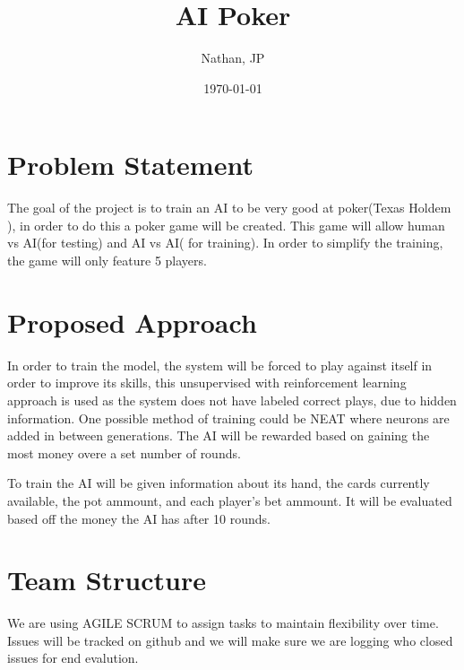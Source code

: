 \documentclass[11pt]{article}
\title{AI Poker}
\author{Nathan, JP}
\date{\today}
\begin{document}
\maketitle
\section{Problem Statement}
The goal of the project is to train an AI to be very good at poker(Texas Holdem \cite{TexasHoldEm}),
in order to do this a poker game will be created. This game will allow human vs AI(for testing) and AI vs AI(
for training). In order to simplify the training, the game will only feature 5 players.

\section{Proposed Approach}
In order to train the model, the system will be forced to play against itself in order to improve its skills,
this unsupervised with reinforcement learning approach is used as the system does not have labeled correct
plays, due to hidden information. One possible method of training could be NEAT\cite{NEAT} where neurons are
added in between generations. The AI will be rewarded based on gaining the most money overe a set number of rounds.

To train the AI will be given information about its hand, the cards currently available, the pot ammount, and
each player's bet ammount. It will be evaluated based off the money the AI has after 10 rounds.

\section{Team Structure}
We are using AGILE SCRUM to assign tasks to maintain flexibility over time. Issues will be tracked on github and
we will make sure we are logging who closed issues for end evalution.
\end{document}
